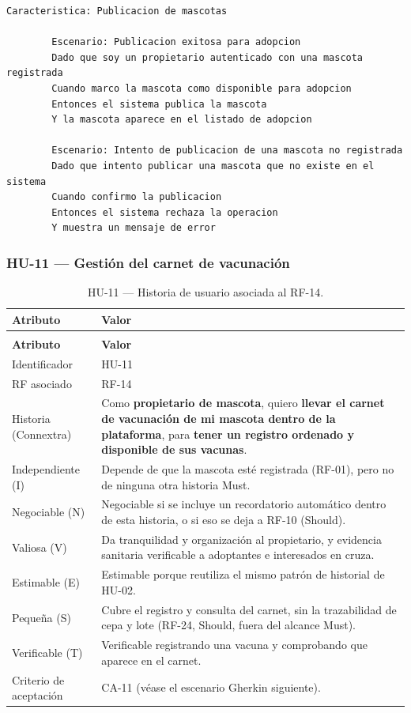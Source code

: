 \documentclass[journal,onecolumn]{IEEEtran}
\makeatletter
\newenvironment{atributos}[2]{%
	\small
	\begin{longtable}{@{}>{\raggedright\arraybackslash}p{4.2cm} >{\raggedright\arraybackslash}p{11.2cm}@{}}
		\caption{#2}\label{tab:#1}\\
		\toprule
		\textbf{Atributo} & \textbf{Valor} \\
		\midrule
		\endfirsthead
		\multicolumn{2}{@{}l}{\small\itshape (continuación)}\\
		\toprule
		\textbf{Atributo} & \textbf{Valor} \\
		\midrule
		\endhead
		\bottomrule
		\endlastfoot
	}{%
	\end{longtable}
	\normalsize
}
\makeatother
\begin{document}
	\begin{lstlisting}[style=gherkin,caption={CA-10 --- Escenario de aceptación de la historia HU-10.},label={lst:ca10}]
		Caracteristica: Publicacion de mascotas
		
		Escenario: Publicacion exitosa para adopcion
		Dado que soy un propietario autenticado con una mascota registrada
		Cuando marco la mascota como disponible para adopcion
		Entonces el sistema publica la mascota
		Y la mascota aparece en el listado de adopcion
		
		Escenario: Intento de publicacion de una mascota no registrada
		Dado que intento publicar una mascota que no existe en el sistema
		Cuando confirmo la publicacion
		Entonces el sistema rechaza la operacion
		Y muestra un mensaje de error
	\end{lstlisting}
	
	\subsubsection{HU-11 --- Gestión del carnet de vacunación}
	
	\begin{atributos}{HU-11}{HU-11 --- Historia de usuario asociada al RF-14.}
		Identificador & HU-11 \\
		RF asociado & RF-14 \\
		Historia (Connextra) & Como \textbf{propietario de mascota}, quiero \textbf{llevar el carnet de vacunación de mi mascota dentro de la plataforma}, para \textbf{tener un registro ordenado y disponible de sus vacunas}. \\
		Independiente (I) & Depende de que la mascota esté registrada (RF-01), pero no de ninguna otra historia Must. \\
		Negociable (N) & Negociable si se incluye un recordatorio automático dentro de esta historia, o si eso se deja a RF-10 (Should). \\
		Valiosa (V) & Da tranquilidad y organización al propietario, y evidencia sanitaria verificable a adoptantes e interesados en cruza. \\
		Estimable (E) & Estimable porque reutiliza el mismo patrón de historial de HU-02. \\
		Pequeña (S) & Cubre el registro y consulta del carnet, sin la trazabilidad de cepa y lote (RF-24, Should, fuera del alcance Must). \\
		Verificable (T) & Verificable registrando una vacuna y comprobando que aparece en el carnet. \\
		Criterio de aceptación & CA-11 (véase el escenario Gherkin siguiente). \\
	\end{atributos}
	
\end{document}
